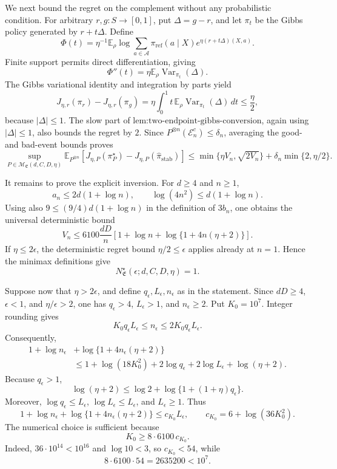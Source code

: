 We next bound the regret on the complement without any probabilistic condition. For arbitrary \(r,g:S\to[0,1]\), put \(\Delta=g-r\), and let \(\pi_t\) be the Gibbs policy generated by \(r+t\Delta\). Define
\[
\Phi(t)=
\eta^{-1}\mathbb E_\rho
\log\sum_{a\in\mathcal A}
\pi_{\mathrm{ref}}(a\mid X)
e^{\eta(r+t\Delta)(X,a)}.
\]
Finite support permits direct differentiation, giving
\[
\Phi''(t)
=\eta\mathbb E_\rho
\operatorname{Var}_{\pi_t}(\Delta).
\]
The Gibbs variational identity and integration by parts yield
\[
J_{\eta,r}(\pi_r)-J_{\eta,r}(\pi_g)
=\eta\int_0^1t\,
\mathbb E_\rho\operatorname{Var}_{\pi_t}(\Delta)\,dt
\le\frac\eta2,
\]
because \(|\Delta|\le1\). The slow part of \(\text{lem:two-endpoint-gibbs-conversion}\), again using \(|\Delta|\le1\), also bounds the regret by \(2\). Since \(P^{\otimes n}(\mathcal E_n^c)\le\delta_n\), averaging the good- and bad-event bounds proves
\[
\sup_{P\in\mathcal M_{\mathfrak E}(d,C,D,\eta)}
\mathbb E_{P^{\otimes n}}\left[
J_{\eta,P}(\pi_P^\star)
-J_{\eta,P}(\widehat\pi_{\mathrm{stab}})
\right]
\le
\min\{\eta V_n,\sqrt{2V_n}\}
+\delta_n\min\{2,\eta/2\}.
\]

It remains to prove the explicit inversion. For \(d\ge4\) and \(n\ge1\),
\[
a_n\le2d(1+\log n),
\qquad
\log(4n^2)\le d(1+\log n).
\]
Using also \(9\le(9/4)d(1+\log n)\) in the definition of \(3b_n\), one obtains the universal deterministic bound
\[
V_n
\le6100\frac{dD}{n}
\left[
1+\log n+\log\{1+4n(\eta+2)\}
\right].
\]
If \(\eta\le2\epsilon\), the deterministic regret bound \(\eta/2\le\epsilon\) applies already at \(n=1\). Hence the minimax definitions give
\[
N^\star_{\mathfrak E}(\epsilon;d,C,D,\eta)=1.
\]

Suppose now that \(\eta>2\epsilon\), and define \(q_\epsilon,L_\epsilon,n_\epsilon\) as in the statement. Since \(dD\ge4\), \(\epsilon<1\), and \(\eta/\epsilon>2\), one has \(q_\epsilon>4\), \(L_\epsilon>1\), and \(n_\epsilon\ge2\). Put \(K_0=10^7\). Integer rounding gives
\[
K_0q_\epsilon L_\epsilon
\le n_\epsilon
\le2K_0q_\epsilon L_\epsilon.
\]
Consequently,
\[
\begin{aligned}
1+\log n_\epsilon
&+\log\{1+4n_\epsilon(\eta+2)\}\\
&\le
1+\log(18K_0^2)
+2\log q_\epsilon
+2\log L_\epsilon
+\log(\eta+2).
\end{aligned}
\]
Because \(q_\epsilon>1\),
\[
\log(\eta+2)
\le\log2+\log\{1+(1+\eta)q_\epsilon\}.
\]
Moreover, \(\log q_\epsilon\le L_\epsilon\), \(\log L_\epsilon\le L_\epsilon\), and \(L_\epsilon\ge1\). Thus
\[
1+\log n_\epsilon
+\log\{1+4n_\epsilon(\eta+2)\}
\le c_{K_0}L_\epsilon,
\qquad
c_{K_0}=6+\log(36K_0^2).
\]
The numerical choice is sufficient because
\[
K_0\ge8\cdot6100\,c_{K_0}.
\]
Indeed, \(36\cdot10^{14}<10^{16}\) and \(\log10<3\), so \(c_{K_0}<54\), while
\[
8\cdot6100\cdot54=2635200<10^7.
\]

